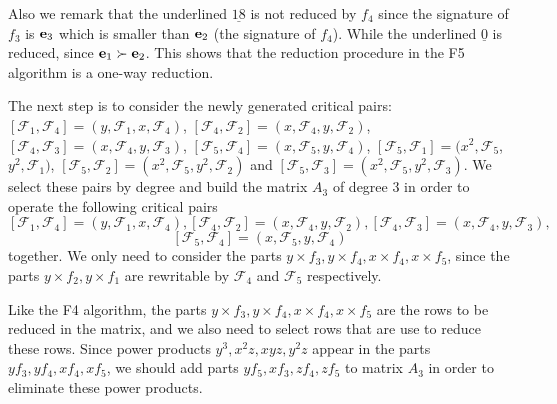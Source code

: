 \documentclass[preprint,authoryear,3p,12pt]{elsarticle}
\def\eb{{\bf e}}
\begin{document}
Also we remark that the underlined $\underline{18}$ is not reduced
by $f_4$ since the signature of $f_3$ is $\eb_3$ which is smaller
than $\eb_2$ (the signature of $f_4$). While the underlined
$\underline{0}$ is reduced, since $\eb_1 \succ \eb_2$. This shows
that the reduction procedure in the F5 algorithm is a one-way
reduction.

The next step is to consider the newly generated critical pairs:
$[{\mathcal F}_1, {\mathcal F}_4]=(y, {\mathcal F}_1, x, {\mathcal
F}_4)$, $[{\mathcal F}_4, {\mathcal F}_2]=(x, {\mathcal F}_4, y,
{\mathcal F}_2)$, $[{\mathcal F}_4, {\mathcal F}_3]=(x, {\mathcal
F}_4, y, {\mathcal F}_3)$, $[{\mathcal F}_5, {\mathcal F}_4]=(x,
{\mathcal F}_5, y, {\mathcal F}_4)$, $[{\mathcal F}_5, {\mathcal
F}_1]=(x^2, {\mathcal F}_5$, $y^2, {\mathcal F}_1)$, $[{\mathcal
F}_5, {\mathcal F}_2]=(x^2, {\mathcal F}_5, y^2, {\mathcal F}_2)$
and $[{\mathcal F}_5, {\mathcal F}_3]=(x^2, {\mathcal F}_5, y^2,
{\mathcal F}_3)$. We select these pairs by degree and build the
matrix $A_3$ of degree $3$ in order to operate the following
critical pairs
$$[{\mathcal F}_1, {\mathcal F}_4]=(y, {\mathcal F}_1, x, {\mathcal F}_4), [{\mathcal
F}_4, {\mathcal F}_2]=(x, {\mathcal F}_4, y, {\mathcal F}_2),
[{\mathcal F}_4, {\mathcal F}_3]=(x, {\mathcal F}_4, y, {\mathcal
F}_3),$$ $$[{\mathcal F}_5, {\mathcal F}_4]=(x, {\mathcal F}_5, y,
{\mathcal F}_4)$$ together. We only need to consider the parts
$y\times f_3, y\times f_4, x\times f_4, x\times f_5$, since the
parts $y\times f_2, y\times f_1$ are rewritable by ${\mathcal
F}_4$ and ${\mathcal F}_5$ respectively.

Like the F4 algorithm, the parts $y\times f_3, y\times f_4, x\times
f_4, x\times f_5$ are the rows to be reduced in the matrix, and we
also need to select rows that are use to reduce these rows. Since
power products $y^3, x^2z, xyz, y^2z$ appear in the parts $yf_3,
yf_4, xf_4, xf_5$, we should add parts $yf_5, xf_3, zf_4, zf_5$ to
matrix $A_3$ in order to eliminate these power products.
\end{document}
